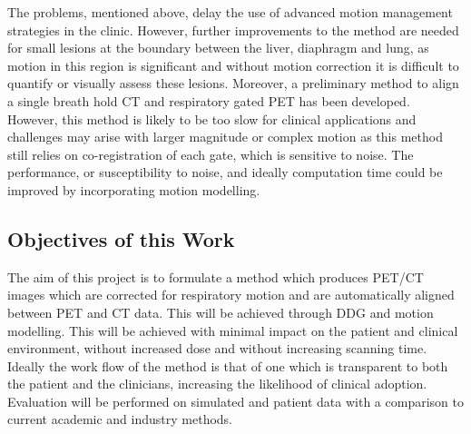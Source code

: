         The problems, mentioned above, delay the use of advanced motion management strategies in the clinic. However, further improvements to the method are needed for small lesions at the boundary between the liver, diaphragm and lung, as motion in this region is significant and without motion correction it is difficult to quantify or visually assess these lesions. Moreover, a preliminary method to align a single breath hold \gls{CT} and respiratory gated \gls{PET} has been developed. However, this method is likely to be too slow for clinical applications and challenges may arise with larger magnitude or complex motion as this method still relies on co-registration of each gate, which is sensitive to noise. The performance, or susceptibility to noise, and ideally computation time could be improved by incorporating motion modelling. 
            
        \subsection{Objectives of this Work} \label{sec:objectives_of_this_work}
            The aim of this project is to formulate a method which produces \gls{PET}/\gls{CT} images which are corrected for respiratory motion and are automatically aligned between \gls{PET} and \gls{CT} data. This will be achieved through \gls{DDG} and motion modelling. %
            This will be achieved with minimal impact on the patient and clinical environment, without increased dose and without increasing scanning time. Ideally the work flow of the method is that of one which is transparent to both the patient and the clinicians, increasing the likelihood of clinical adoption. Evaluation will be performed on simulated and patient data with a comparison to current academic and industry methods.
        
        
